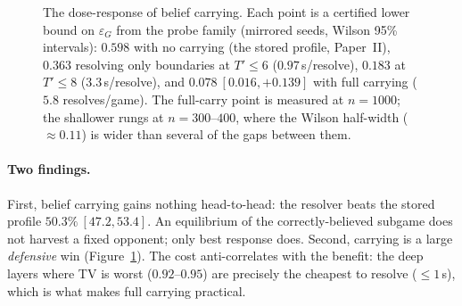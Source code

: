 \documentclass[11pt]{article}
\theoremstyle{plain}
\theoremstyle{definition}
\theoremstyle{remark}
\newcommand{\game}{\ensuremath{G}}
\newcommand{\epsG}{\ensuremath{\varepsilon_{\game}}}
\begin{document}
\begin{figure}[t]
\centering
{}
\caption{The dose-response of belief carrying. Each point is a
certified lower bound on $\epsG$ from the probe family (mirrored
seeds, Wilson 95\% intervals): $0.598$ with no carrying (the stored
profile, Paper~II), $0.363$ resolving only boundaries at $T'\le6$
($0.97$\,s/resolve), $0.183$ at $T'\le8$ ($3.3$\,s/resolve), and
$0.078\ [0.016,+0.139]$ with full carrying ($5.8$ resolves/game). The
full-carry point is measured at $n=1000$; the shallower rungs at
$n=300$--$400$, where the Wilson half-width ($\approx0.11$) is wider
than several of the gaps between them.}
\label{fig:dose}
\end{figure}

\paragraph{Two findings.} First, belief carrying gains nothing
head-to-head: the resolver beats the stored profile
$50.3\%\ [47.2,53.4]$. An equilibrium of the correctly-believed
subgame does not harvest a fixed opponent; only best response does.
Second, carrying is a large \emph{defensive} win
(Figure~\ref{fig:dose}). The cost anti-correlates with the benefit:
the deep layers where TV is worst ($0.92$--$0.95$) are precisely the
cheapest to resolve ($\le1$\,s), which is what makes full carrying
practical.
\end{document}
